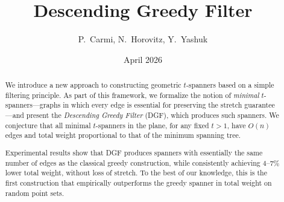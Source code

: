 \documentclass{article}
\title{Descending Greedy Filter}
\author{P.~Carmi, N.~Horovitz, Y.~Yashuk}
\date{April 2026}
\newcommand{\old}[1]{{}}
\DeclareMathOperator{\wt}{wt}
\DeclareMathOperator{\MST}{MST}
\begin{document}
\maketitle

\begin{abstract}
We introduce a new approach to constructing geometric $t$-spanners based on a simple filtering principle. As part of this framework, we formalize the notion of \emph{minimal} $t$-spanners—graphs in which every edge is essential for preserving the stretch guarantee—and present the \emph{Descending Greedy Filter} (DGF), which produces such spanners.
We conjecture that all minimal $t$-spanners in the plane, for any fixed $t>1$, have $O(n)$ edges and total weight proportional to that of the minimum spanning tree.

Experimental results show that DGF produces spanners with essentially the same number of edges as the classical greedy construction, while consistently achieving $4$--$7\%$ lower total weight, without loss of stretch. To the best of our knowledge, this is the first construction that empirically outperforms the greedy spanner in total weight on random point sets.

\old{
We present a new construction of geometric spanners, which we call the
\emph{Descending Greedy Filter} (DGF). Starting from the complete graph,
DGF examines edges in \emph{non-ascending} order of length and discards
every edge whose removal does not violate the $t$-spanner condition.
We give the algorithm, its time and space complexity, and conjecture
that its output has $O(n)$ edges and total weight $O(\wt(\MST(P)))$.
We then extract from DGF a general filtering procedure that turns any
$t$-spanner into a \emph{minimal} $t$-spanner (one in which every edge
is essential), and conjecture the same sparsity and weight bounds for
every minimal $t$-spanner in the plane. A recursive binary-search
implementation reduces the number of all-pairs shortest path (APSP)
computations from $\Theta(m)$ to $O(k\log m)$, where $m$ is the input
size and $k$ is the number of edges in the output, giving a near-linear
speedup in the number of APSP calls. Experiments on random point sets
in the unit square with $n\in\{1000,\,2000,\,5000\}$ and
$t\in\{1.001,\,1.01,\,1.1,\,1.5\}$ show that DGF and its variants
produce spanners whose edge count matches the classical greedy spanner
to within a fraction of a percent while using $4$--$7\%$ less total
weight, with the exact stretch preserved.
} %

\end{abstract}
\end{document}
